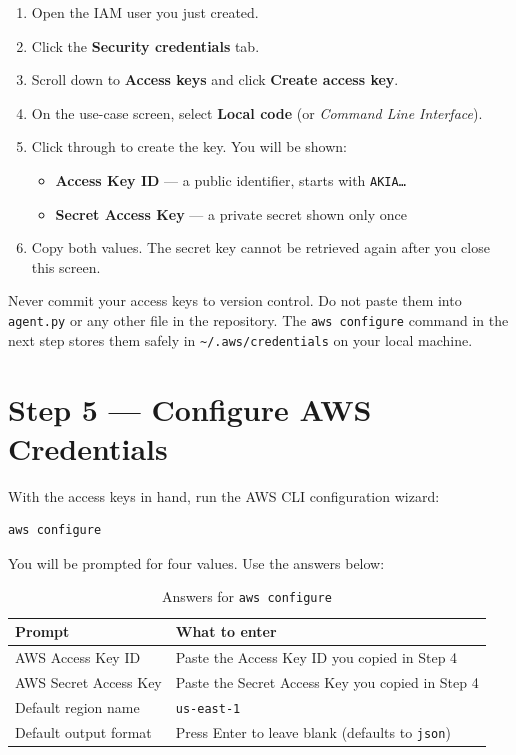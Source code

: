 \documentclass[12pt, a4paper]{article}
\begin{document}
\begin{enumerate}[leftmargin=1.5em]
  \item Open the IAM user you just created.
  \item Click the \textbf{Security credentials} tab.
  \item Scroll down to \textbf{Access keys} and click \textbf{Create access key}.
  \item On the use-case screen, select \textbf{Local code} (or \textit{Command Line Interface}).
  \item Click through to create the key. You will be shown:
    \begin{itemize}
      \item \textbf{Access Key ID} — a public identifier, starts with \texttt{AKIA\ldots}
      \item \textbf{Secret Access Key} — a private secret shown only once
    \end{itemize}
  \item Copy both values. The secret key cannot be retrieved again after you close this screen.
\end{enumerate}

\begin{warnbox}
Never commit your access keys to version control. Do not paste them into \texttt{agent.py} or any other file in the repository. The \texttt{aws configure} command in the next step stores them safely in \texttt{\textasciitilde/.aws/credentials} on your local machine.
\end{warnbox}

\section{Step 5 — Configure AWS Credentials}

With the access keys in hand, run the AWS CLI configuration wizard:

\begin{lstlisting}[style=shellstyle]
aws configure
\end{lstlisting}

You will be prompted for four values. Use the answers below:

\begin{table}[h]
\centering
\renewcommand{\arraystretch}{1.4}
\begin{tabularx}{\textwidth}{lX}
\toprule
\textbf{Prompt} & \textbf{What to enter} \\
\midrule
AWS Access Key ID     & Paste the Access Key ID you copied in Step 4 \\
AWS Secret Access Key & Paste the Secret Access Key you copied in Step 4 \\
Default region name   & \texttt{us-east-1} \\
Default output format & Press Enter to leave blank (defaults to \texttt{json}) \\
\bottomrule
\end{tabularx}
\caption{Answers for \texttt{aws configure}}
\end{table}
\end{document}

